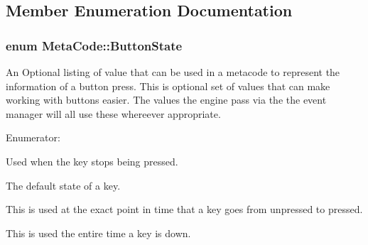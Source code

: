 \subsection{Member Enumeration Documentation}
\hypertarget{classMetaCode_a8bcce67af20f4f779ba6f5387e438077}{
\subsubsection[{ButtonState}]{\setlength{\rightskip}{0pt plus 5cm}enum {\bf MetaCode::ButtonState}}}
\label{d7/d72/classMetaCode_a8bcce67af20f4f779ba6f5387e438077}


An Optional listing of value that can be used in a metacode to represent the information of a button press. This is optional set of values that can make working with buttons easier. The values the engine pass via the the event manager will all use these whereever appropriate. \begin{Desc}
\item[Enumerator: ]\par
\begin{description}
\item[{\em 
\hypertarget{classMetaCode_a8bcce67af20f4f779ba6f5387e438077aa16bc921174974d9e30752eff7af8336}{
BUTTON\_\-LIFTING}
\label{d7/d72/classMetaCode_a8bcce67af20f4f779ba6f5387e438077aa16bc921174974d9e30752eff7af8336}
}]Used when the key stops being pressed. \item[{\em 
\hypertarget{classMetaCode_a8bcce67af20f4f779ba6f5387e438077a87e2c9bdb3c969158f85543759dce244}{
BUTTON\_\-UP}
\label{d7/d72/classMetaCode_a8bcce67af20f4f779ba6f5387e438077a87e2c9bdb3c969158f85543759dce244}
}]The default state of a key. \item[{\em 
\hypertarget{classMetaCode_a8bcce67af20f4f779ba6f5387e438077a1113791ce46932b93099ba765116b0d7}{
BUTTON\_\-PRESSING}
\label{d7/d72/classMetaCode_a8bcce67af20f4f779ba6f5387e438077a1113791ce46932b93099ba765116b0d7}
}]This is used at the exact point in time that a key goes from unpressed to pressed. \item[{\em 
\hypertarget{classMetaCode_a8bcce67af20f4f779ba6f5387e438077a73ef49474af25ad4c503fe27420c6448}{
BUTTON\_\-DOWN}
\label{d7/d72/classMetaCode_a8bcce67af20f4f779ba6f5387e438077a73ef49474af25ad4c503fe27420c6448}
}]This is used the entire time a key is down. \end{description}
\end{Desc}



